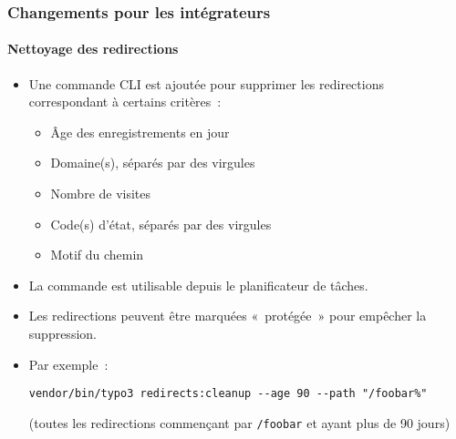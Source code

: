 %

\begin{frame}[fragile]
	\frametitle{Changements pour les intégrateurs}
	\framesubtitle{Nettoyage des redirections}


	\begin{itemize}
		\item Une commande CLI est ajoutée pour supprimer les redirections correspondant à certains critères~:
			\begin{itemize}
				\item Âge des enregistrements en jour
				\item Domaine(s), séparés par des virgules
				\item Nombre de visites
				\item Code(s) d'état, séparés par des virgules
				\item Motif du chemin
			\end{itemize}
		\item La commande est utilisable depuis le planificateur de tâches.
		\item Les redirections peuvent être marquées «~protégée~» pour empêcher la suppression.
		\item Par exemple~:
\begin{lstlisting}
vendor/bin/typo3 redirects:cleanup --age 90 --path "/foobar%"
\end{lstlisting}

			\smaller
				(toutes les redirections commençant par \texttt{/foobar} et ayant plus de 90 jours)
			\normalsize

	\end{itemize}
\end{frame}

